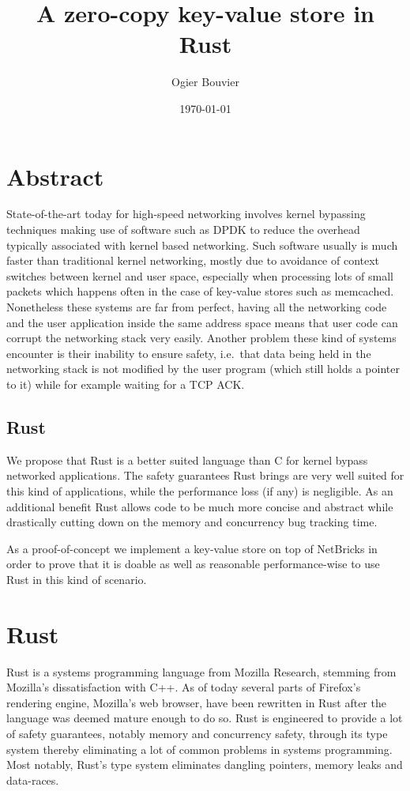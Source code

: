 \documentclass[11pt]{article}
\author{Ogier Bouvier}
\date{\today}
\title{A zero-copy key-value store in Rust}
\begin{document}
\maketitle
\tableofcontents
\newpage

\section{Abstract}
State-of-the-art today for high-speed networking involves kernel
bypassing techniques making use of software such as DPDK to reduce the
overhead typically associated with kernel based networking. Such
software usually is much faster than traditional kernel networking,
mostly due to avoidance of context switches between kernel and
user space, especially when processing lots of small packets which
happens often in the case of key-value stores such as memcached.
Nonetheless these systems are far from perfect, having all the
networking code and the user application inside the same address
space means that user code can corrupt the networking stack very
easily. Another problem these kind of systems encounter is their
inability to ensure safety, i.e.\ that data being held in the
networking stack is not modified by the user program (which still
holds a pointer to it) while for example waiting for a TCP ACK.

\subsection{Rust}
We propose that Rust is a better suited language than C for kernel
bypass networked applications. The safety guarantees Rust
brings are very well suited for this kind of applications, while the
performance loss (if any) is negligible. As an additional benefit Rust
allows code to be much more concise and abstract while drastically
cutting down on the memory and concurrency bug tracking time.

As a proof-of-concept we implement a key-value store on top of
NetBricks in order to prove that it is doable as well as reasonable
performance-wise to use Rust in this kind of scenario.

\section{Rust}
Rust is a systems programming language from Mozilla Research, stemming
from Mozilla's dissatisfaction with C++. As of today several parts of
Firefox's rendering engine, Mozilla's web browser, have been rewritten
in  Rust after the language was deemed mature enough to do so. Rust is
engineered to  provide a lot of safety guarantees, notably memory and
concurrency safety, through its type system thereby eliminating a lot
of common problems in systems programming. Most notably, Rust's type
system eliminates dangling pointers, memory leaks and data-races.
\end{document}
